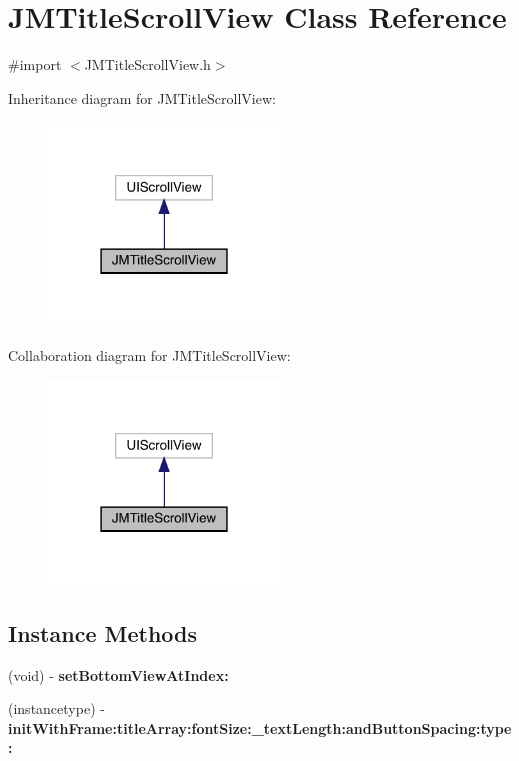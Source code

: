 \hypertarget{interface_j_m_title_scroll_view}{}\section{J\+M\+Title\+Scroll\+View Class Reference}
\label{interface_j_m_title_scroll_view}


{\ttfamily \#import $<$J\+M\+Title\+Scroll\+View.\+h$>$}



Inheritance diagram for J\+M\+Title\+Scroll\+View\+:\nopagebreak
\begin{figure}[H]
\begin{center}
\leavevmode
\includegraphics[width=174pt]{interface_j_m_title_scroll_view__inherit__graph}
\end{center}
\end{figure}


Collaboration diagram for J\+M\+Title\+Scroll\+View\+:\nopagebreak
\begin{figure}[H]
\begin{center}
\leavevmode
\includegraphics[width=174pt]{interface_j_m_title_scroll_view__coll__graph}
\end{center}
\end{figure}
\subsection*{Instance Methods}
\begin{DoxyCompactItemize}
\item 
\mbox{\label{interface_j_m_title_scroll_view_af2862f8ef1487d2b86f5c44f5a5c26ad}} 
(void) -\/ {\bfseries set\+Bottom\+View\+At\+Index\+:}
\item 
\mbox{\label{interface_j_m_title_scroll_view_acea8f45ef03a8992a7e23d17f1c42a3b}} 
(instancetype) -\/ {\bfseries init\+With\+Frame\+:title\+Array\+:font\+Size\+:\+\_\+text\+Length\+:and\+Button\+Spacing\+:type\+:}
\end{DoxyCompactItemize}
